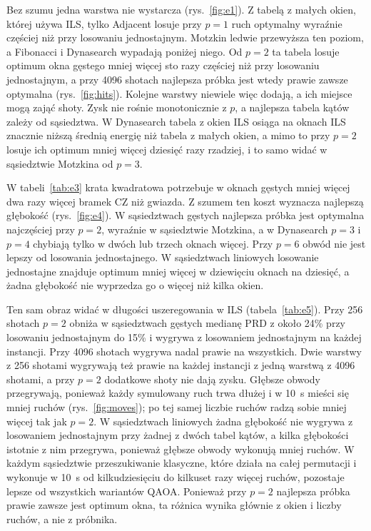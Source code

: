 \documentclass[runningheads]{llncs}
\begin{document}
Bez szumu jedna warstwa nie wystarcza (rys.~\ref{fig:e1}). Z tabelą z małych
okien, której używa ILS, tylko Adjacent losuje przy $p = 1$ ruch optymalny wyraźnie częściej niż przy
losowaniu jednostajnym. Motzkin ledwie przewyższa ten poziom,
a Fibonacci i Dynasearch wypadają poniżej niego. Od
$p = 2$ ta tabela losuje optimum okna gęstego mniej więcej sto razy częściej niż przy losowaniu jednostajnym, a przy 4096 shotach najlepsza próbka jest wtedy
prawie zawsze optymalna (rys.~\ref{fig:hits}). Kolejne warstwy niewiele więc
dodają, a ich miejsce mogą zająć shoty. Zysk nie rośnie monotonicznie z $p$,
a najlepsza tabela kątów zależy od sąsiedztwa. W Dynasearch tabela z okien
ILS osiąga na oknach ILS znacznie niższą średnią energię niż tabela z małych
okien, a mimo to przy $p = 2$ losuje ich optimum mniej więcej dziesięć razy
rzadziej, i to samo widać w sąsiedztwie Motzkina od $p = 3$.

W tabeli~\ref{tab:e3} krata kwadratowa potrzebuje w oknach gęstych mniej
więcej dwa razy więcej bramek CZ niż gwiazda. Z szumem ten koszt wyznacza
najlepszą głębokość (rys.~\ref{fig:e4}). W sąsiedztwach gęstych najlepsza
próbka jest optymalna najczęściej przy $p = 2$, wyraźnie w sąsiedztwie Motzkina,
a w Dynasearch $p = 3$ i $p = 4$ chybiają tylko w dwóch lub trzech oknach
więcej. Przy $p = 6$ obwód nie jest lepszy od losowania jednostajnego.
W sąsiedztwach liniowych losowanie jednostajne znajduje optimum mniej więcej
w dziewięciu oknach na dziesięć, a żadna głębokość nie wyprzedza go o więcej
niż kilka okien.

Ten sam obraz widać w długości uszeregowania w ILS (tabela~\ref{tab:e5}).
Przy 256 shotach $p = 2$ obniża w sąsiedztwach gęstych medianę PRD z około
24\% przy losowaniu jednostajnym do 15\% i wygrywa z losowaniem jednostajnym
na każdej instancji. Przy 4096 shotach wygrywa nadal prawie na wszystkich.
Dwie warstwy z 256 shotami wygrywają też prawie na każdej instancji z jedną
warstwą z 4096 shotami, a przy $p = 2$ dodatkowe shoty nie dają zysku.
Głębsze obwody przegrywają, ponieważ każdy symulowany ruch trwa dłużej i w 10~s
mieści się mniej ruchów (rys.~\ref{fig:moves}); po tej samej liczbie ruchów
radzą sobie mniej więcej tak jak $p = 2$. W sąsiedztwach liniowych żadna głębokość nie wygrywa z losowaniem
jednostajnym przy żadnej z dwóch tabel kątów, a kilka głębokości istotnie
z nim przegrywa, ponieważ głębsze obwody wykonują mniej ruchów. W każdym sąsiedztwie
przeszukiwanie klasyczne, które działa na całej permutacji i wykonuje w 10~s
od kilkudziesięciu do kilkuset razy więcej ruchów, pozostaje lepsze od
wszystkich wariantów QAOA. Ponieważ przy $p = 2$ najlepsza próbka prawie
zawsze jest optimum okna, ta różnica wynika głównie z okien i liczby ruchów,
a nie z próbnika.
\end{document}
